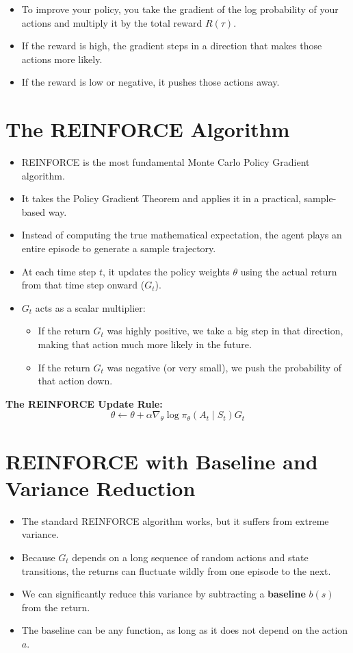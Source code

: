 \documentclass[12pt]{article}
\begin{document}
\begin{itemize}[label=$\bullet$]
    \item To improve your policy, you take the gradient of the log probability of your actions and multiply it by the total reward $R(\tau)$. 
    \item If the reward is high, the gradient steps in a direction that makes those actions more likely. 
    \item If the reward is low or negative, it pushes those actions away.
\end{itemize}

\section*{The REINFORCE Algorithm}
\begin{itemize}[label=$\bullet$]
    \item REINFORCE is the most fundamental Monte Carlo Policy Gradient algorithm.
    \item It takes the Policy Gradient Theorem and applies it in a practical, sample-based way.
    \item Instead of computing the true mathematical expectation, the agent plays an entire episode to generate a sample trajectory.
    \item At each time step $t$, it updates the policy weights $\theta$ using the actual return from that time step onward ($G_t$).
    \item $G_t$ acts as a scalar multiplier:
    \begin{itemize}[label=$\circ$]
        \item If the return $G_t$ was highly positive, we take a big step in that direction, making that action much more likely in the future.
        \item If the return $G_t$ was negative (or very small), we push the probability of that action down.
    \end{itemize}
\end{itemize}

\noindent\textbf{The REINFORCE Update Rule:}
$$\theta \leftarrow \theta + \alpha \nabla_\theta \log \pi_\theta(A_t \mid S_t) G_t$$

\section*{REINFORCE with Baseline and Variance Reduction}
\begin{itemize}[label=$\bullet$]
    \item The standard REINFORCE algorithm works, but it suffers from extreme variance.
    \item Because $G_t$ depends on a long sequence of random actions and state transitions, the returns can fluctuate wildly from one episode to the next.
    \item We can significantly reduce this variance by subtracting a \textbf{baseline} $b(s)$ from the return.
    \item The baseline can be any function, as long as it does not depend on the action $a$.
\end{itemize}
\end{document}
